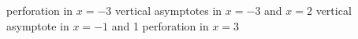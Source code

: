 \begin{Answer}\phantom{}
    
		\Question perforation in $x=-3$
		 vertical asymptotes in $x=-3$ and $x=2$
		 vertical asymptote in $x=-1$ and 1 perforation in $x=3$ 

\end{Answer}




\fi %

